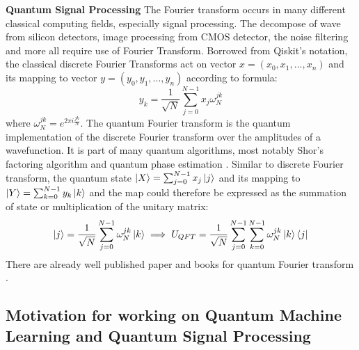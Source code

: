 \documentclass{article}
\begin{document}
\textbf{Quantum Signal Processing}
The Fourier transform occurs in many different classical computing 
fields, especially signal processing. The decompose of wave from 
silicon detectors, image processing from CMOS detector, the noise filtering
and more all require use of Fourier Transform. Borrowed from Qiskit's notation, 
the classical discrete Fourier Transforms
act on vector $x = (x_0, x_1,...,x_n)$ and its mapping to vector $y = (y_0, y_1,...,y_n)$
according to formula:
\begin{equation}
  y_k = \frac{1}{\sqrt{N}} \sum^{N-1}_{j=0} x_j \omega_N^{jk}
\end{equation}
where $\omega_N^{jk} = e^{2\pi i \frac{jk}{N}}$. The quantum Fourier 
transform is the quantum implementation of the discrete Fourier 
transform over the amplitudes of a wavefunction. It is part of 
many quantum algorithms, most notably Shor's factoring algorithm \cite{qc_Shor_1997}
and quantum phase estimation \cite{qc_phase_estimation}. Similar to discrete Fourier 
transform, the quantum state $ \ket{X} = \sum^{N-1}_{j=0} x_j \ket{j} $ and its mapping to 
$ \ket{Y} = \sum^{N-1}_{k=0} y_k \ket{k} $
and the map could therefore be expressed as the summation of state 
or multiplication of the unitary matrix:
\begin{equation}
  \ket{j}  = \frac{1}{\sqrt{N}} \sum^{N-1}_{j=0} \omega_N^{jk} \ket{k} \implies
  U_{QFT}= \frac{1}{\sqrt{N}} \sum^{N-1}_{j=0} \sum^{N-1}_{k=0}  \omega_N^{jk} \ket{k} \bra{j}
\end{equation}
There are already well published paper and books for quantum Fourier transform \cite{qc_book}.

\subsection{Motivation for working on Quantum Machine Learning and Quantum Signal Processing}
\end{document}

